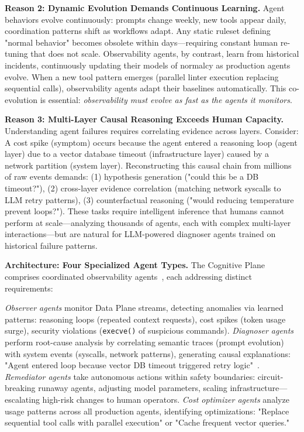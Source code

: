 \documentclass[sigplan,screen,9pt]{acmart}
\begin{document}
\textbf{Reason 2: Dynamic Evolution Demands Continuous Learning.} Agent behaviors evolve continuously: prompts change weekly, new tools appear daily, coordination patterns shift as workflows adapt. Any static ruleset defining "normal behavior" becomes obsolete within days—requiring constant human re-tuning that does not scale. Observability agents, by contrast, learn from historical incidents, continuously updating their models of normalcy as production agents evolve. When a new tool pattern emerges (parallel linter execution replacing sequential calls), observability agents adapt their baselines automatically. This co-evolution is essential: \emph{observability must evolve as fast as the agents it monitors}.

\textbf{Reason 3: Multi-Layer Causal Reasoning Exceeds Human Capacity.} Understanding agent failures requires correlating evidence across layers. Consider: A cost spike (symptom) occurs because the agent entered a reasoning loop (agent layer) due to a vector database timeout (infrastructure layer) caused by a network partition (system layer). Reconstructing this causal chain from millions of raw events demands: (1) hypothesis generation ("could this be a DB timeout?"), (2) cross-layer evidence correlation (matching network syscalls to LLM retry patterns), (3) counterfactual reasoning ("would reducing temperature prevent loops?"). These tasks require intelligent inference that humans cannot perform at scale—analyzing thousands of agents, each with complex multi-layer interactions—but are natural for LLM-powered diagnoser agents trained on historical failure patterns.

\textbf{Architecture: Four Specialized Agent Types.} The Cognitive Plane comprises coordinated observability agents~\cite{Rombaut2025Watson,Kim2025AgenticInterp,Dong2024AgentOps}, each addressing distinct requirements:

\emph{Observer agents} monitor Data Plane streams, detecting anomalies via learned patterns: reasoning loops (repeated context requests), cost spikes (token usage surge), security violations (\texttt{execve()} of suspicious commands). \emph{Diagnoser agents} perform root-cause analysis by correlating semantic traces (prompt evolution) with system events (syscalls, network patterns), generating causal explanations: "Agent entered loop because vector DB timeout triggered retry logic"~\cite{Moshkovich2025Pipeline}. \emph{Remediator agents} take autonomous actions within safety boundaries: circuit-breaking runaway agents, adjusting model parameters, scaling infrastructure—escalating high-risk changes to human operators. \emph{Cost optimizer agents} analyze usage patterns across all production agents, identifying optimizations: "Replace sequential tool calls with parallel execution" or "Cache frequent vector queries."
\end{document}
